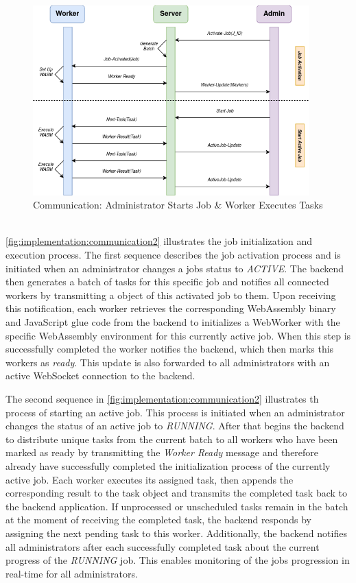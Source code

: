 \begin{figure}[htbp]
    \centering
    \includegraphics[width=0.95\textwidth]{gfx/figures/communication-jobexecution-label.png}
    \caption{Communication: Administrator Starts Job \& Worker Executes Tasks}
    \label{fig:implementation:communication2}
\end{figure}
~\\
\autoref{fig:implementation:communication2} illustrates the job initialization and execution process. The first sequence describes the job activation process and is initiated when an administrator changes a jobs status to \emph{ACTIVE}. The backend then generates a batch of tasks for this specific job and notifies all connected workers by transmitting a object of this activated job to them. Upon receiving this notification, each worker retrieves the corresponding WebAssembly binary and JavaScript glue code from the backend to initializes a WebWorker with the specific WebAssembly environment for this currently active job. When this step is successfully completed the worker notifies the backend, which then marks this workers as \emph{ready}. This update is also forwarded to all administrators with an active WebSocket connection to the backend.

The second sequence in \autoref{fig:implementation:communication2} illustrates th process of starting an active job. This process is initiated when an administrator changes the status of an active job to \emph{RUNNING}. After that begins the backend to distribute unique tasks from the current batch to all workers who have been marked as ready by transmitting the \emph{Worker Ready} message and therefore already have successfully completed the initialization process of the currently active job. Each worker executes its assigned task, then appends the corresponding result to the task object and transmits the completed task back to the backend application. If unprocessed or unscheduled tasks remain in the batch at the moment of receiving the completed task, the backend responds by assigning the next pending task to this worker. Additionally, the backend notifies all administrators after each successfully completed task about the current progress of the \emph{RUNNING} job. This enables monitoring of the jobs progression in real-time for all administrators.

